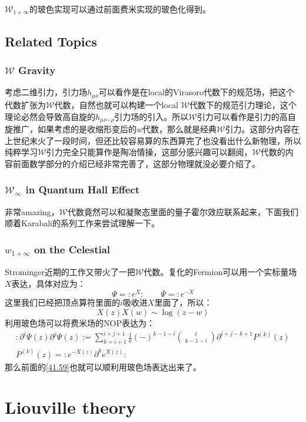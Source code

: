 $\mathcal{W}_{1+\infty}$的玻色实现可以通过前面费米实现的玻色化得到。
\subsection{Related Topics}
\subsubsection{$\mathcal{W}$ Gravity}
考虑二维引力，引力场$h_{\mu\nu}$可以看作是在local的Virasoro代数下的规范场，把这个代数扩张为$\mathcal{W}$代数，自然也就可以构建一个local $\mathcal{W}$代数下的规范引力理论，这个理论必然会导致高自旋的$h_{\mu\nu\cdots\rho}$引力场的引入。所以$\mathcal{W}$引力可以看作是引力的高自旋推广，如果考虑的是收缩形变后的$w$代数，那么就是经典$\mathcal{W}$引力。这部分内容在上世纪末火了一段时间，但还比较容易算的东西算完了也没看出什么新物理，所以纯粹学习$\mathcal{W}$引力完全只能算作是陶冶情操，这部分感兴趣可以翻阅\cite{Hull:1992vj}，$\mathcal{W}$代数的内容前面数学部分的介绍已经非常完善了，这部分物理就没必要介绍了。
\subsubsection{$\mathcal{W}_\infty$ in Quantum Hall Effect}
非常amazing，$\mathcal{W}$代数竟然可以和凝聚态里面的量子霍尔效应联系起来，下面我们顺着Karabali的系列工作\cite{Karabali:1994av,Karabali:1994sg}来尝试理解一下。

\subsubsection{${w}_{1+\infty}$ on the Celestial}
Strominger近期的工作\cite{Strominger:2021mtt}又带火了一把$\mathcal{W}$代数。复化的Fermion可以用一个实标量场$X$表达，具体对应为：
\begin{equation}
	\Psi=:e^X:\quad\quad\overline{\Psi}=:e^{-X}
\end{equation}
这里我们已经把顶点算符里面的$i$吸收进$X$里面了，所以：
\begin{equation}
	X(z)X(w)\sim\log(z-w)
\end{equation}
利用玻色场可以将费米场的NOP表达为：
\begin{equation}
	\begin{gathered}
		:\partial^i\overline{\Psi}(z)\partial^j\Psi(z):=\sum_{k=i+1}^{i+j+1}\frac1k(-)^{k-1-i}\binom\ell{k-1-i}\partial^{i+j-k+1}P^{(k)}(z)\\
		P^{(k)}(z)=:e^{-X(z)}\partial^ke^{X(z)}:
	\end{gathered}
\end{equation}
那么前面的\ref{41.59}也就可以顺利用玻色场表达出来了。
\section{Liouville theory}
